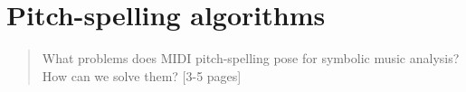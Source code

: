 \chapter{Pitch-spelling algorithms}
\label{chap:chap7}

\begin{quote}
    What problems does MIDI pitch-spelling pose for symbolic music analysis? How can we solve them? [3-5 pages]
\end{quote}
\clearpage














